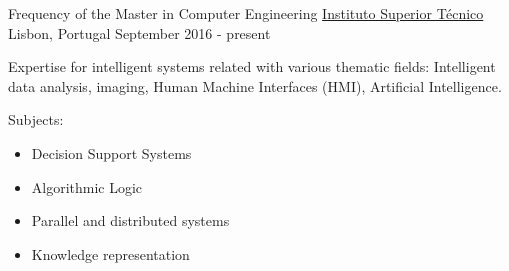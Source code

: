 


\begin{cventries}


\cventry
{Frequency of the Master in Computer Engineering} %
{\href{https://tecnico.ulisboa.pt/en/}{Instituto Superior Técnico}} %
{Lisbon, Portugal} %
{September 2016 - present} %
{  %
\begin{cvitems}
\item {Expertise for intelligent systems related with various thematic fields: Intelligent data analysis, imaging, Human Machine Interfaces (HMI), Artificial Intelligence.}
\item{Subjects:}
\begin{itemize}
\item Decision Support Systems
\item Algorithmic Logic
\item Parallel and distributed systems
\item Knowledge representation
\end{itemize}
\end{cvitems}
}



\end{cventries}
